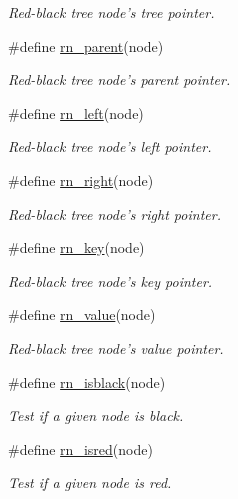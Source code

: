 \begin{CompactItemize}
\begin{CompactList}\small\item\em Red-black tree node's tree pointer. \item\end{CompactList}\item 
\#define \hyperlink{group__dbprim__rbtree_a29}{rn\_\-parent}(node)
\begin{CompactList}\small\item\em Red-black tree node's parent pointer. \item\end{CompactList}\item 
\#define \hyperlink{group__dbprim__rbtree_a30}{rn\_\-left}(node)
\begin{CompactList}\small\item\em Red-black tree node's left pointer. \item\end{CompactList}\item 
\#define \hyperlink{group__dbprim__rbtree_a31}{rn\_\-right}(node)
\begin{CompactList}\small\item\em Red-black tree node's right pointer. \item\end{CompactList}\item 
\#define \hyperlink{group__dbprim__rbtree_a32}{rn\_\-key}(node)
\begin{CompactList}\small\item\em Red-black tree node's key pointer. \item\end{CompactList}\item 
\#define \hyperlink{group__dbprim__rbtree_a33}{rn\_\-value}(node)
\begin{CompactList}\small\item\em Red-black tree node's value pointer. \item\end{CompactList}\item 
\#define \hyperlink{group__dbprim__rbtree_a34}{rn\_\-isblack}(node)
\begin{CompactList}\small\item\em Test if a given node is black. \item\end{CompactList}\item 
\#define \hyperlink{group__dbprim__rbtree_a35}{rn\_\-isred}(node)
\begin{CompactList}\small\item\em Test if a given node is red. \item\end{CompactList}\item 

\end{CompactItemize}
